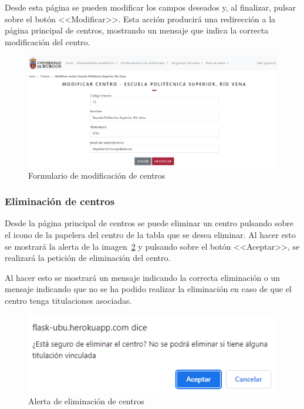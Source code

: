 Desde esta página se pueden modificar los campos deseados y, al finalizar, pulsar sobre el botón <<Modificar>>.
Esta acción producirá una redirección a la página principal de centros, mostrando un mensaje que indica la correcta modificación del centro.

\begin{figure}
	\centering
	\includegraphics[width=\textwidth]{../img/Anexos/Manual usuario/formModCentro.png}
	\caption{Formulario de modificación de centros}\label{pag:formModCentro}
\end{figure}

\subsubsection{Eliminación de centros}
Desde la página principal de centros se puede eliminar un centro pulsando sobre el icono de la papelera del centro de la tabla que se desea eliminar.
Al hacer esto se mostrará la alerta de la imagen~\ref{pag:alertElCentro} y pulsando sobre el botón <<Aceptar>>, se realizará la petición de eliminación del centro.

Al hacer esto se mostrará un mensaje indicando la correcta eliminación o un mensaje indicando que no se ha podido realizar la eliminación en caso de que el centro tenga titulaciones asociadas.

\begin{figure}
	\centering
	\includegraphics[width=\textwidth]{../img/Anexos/Manual usuario/alertElCentro.png}
	\caption{Alerta de eliminación de centros}\label{pag:alertElCentro}
\end{figure}


